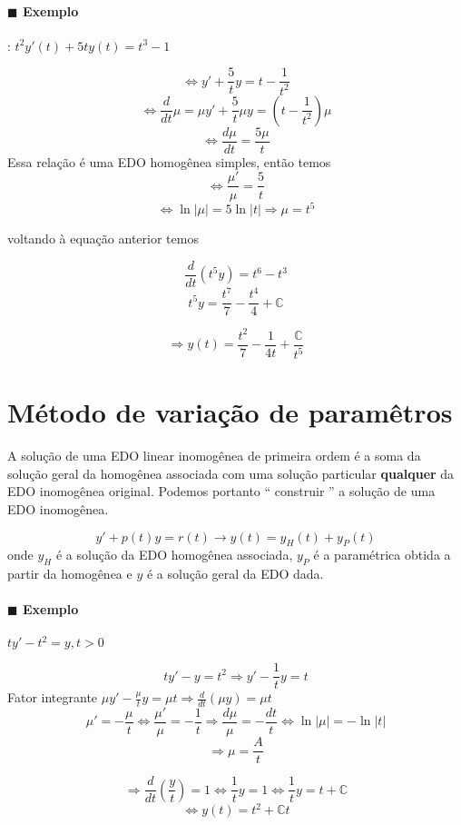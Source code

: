 \paragraph{$\blacksquare$ Exemplo}: \( t^2 y'(t) + 5ty(t) = t^3 - 1 \) 

\[ \Leftrightarrow y' + \frac{5}{t}y = t - \frac{1}{t^2}  \]
\[ \Leftrightarrow \frac{d}{dt}\mu = \mu y' + \frac{5}{t}\mu y = \left( t - \frac{1}{t^2}\right)\mu \]
\[ \Leftrightarrow  \frac{d\mu}{dt}= \frac{5\mu}{t} \]
Essa relação é uma EDO homogênea simples, então temos
\[ \Leftrightarrow \frac{\mu'}{\mu} = \frac{5}{t} \]
\[ \Leftrightarrow \ln|\mu| = 5 \ln |t| \Rightarrow \mu = t^5\]

voltando à equação anterior temos

\[ \frac{d}{dt} \left( t^5 y \right) = t^6 - t^3 \]
\[ t^5 y = \frac{t^7}{7} - \frac{t^4}{4} + \mathbb{C} \]

\[ \Rightarrow y(t) = \frac{t^2}{7}- \frac{1}{4t} + \frac{\mathbb{C}}{t^5} \]


\section{Método de variação de paramêtros}
A solução de uma EDO linear inomogênea de primeira ordem é a soma da solução geral da homogênea
associada com uma solução particular \textbf{qualquer} da EDO inomogênea original.
Podemos portanto `` construir '' a solução de uma EDO inomogênea.


\[ y' + p(t) y = r(t) \rightarrow y(t) = y_{H} (t) + y_{P} (t) \]
onde \( y_{H} \) é a solução da EDO homogênea associada, \( y_P \) é a paramétrica obtida a partir
da homogênea e \( y \) é a solução geral da EDO dada.

\paragraph{$\blacksquare$ Exemplo} \( t y' - t^2 = y, t >0 \) 

\[ t y' - y = t^2 \Rightarrow y' - \frac{1}{t}y = t  \]
Fator integrante \( \mu y' - \frac{\mu}{t}y = \mu t \Rightarrow \frac{d}{dt} \left( \mu y \right) = \mu t \) 
\[ \mu ' = - \frac{\mu }{t} \Leftrightarrow \frac{\mu'}{\mu} = - \frac{1}{t} \Rightarrow \frac{d\mu}{\mu}= - \frac{dt}{t} \Leftrightarrow \ln|\mu| = - \ln|t|\]
\[ \Rightarrow \mu = \frac{A}{t} \]

\[\Rightarrow \frac{d}{dt} \left( \frac{y}{t} \right)  = 1 \Leftrightarrow \frac{1}{t} y = 1 \Leftrightarrow \frac{1}{t}y = t +
  \mathbb{C} \]
\[ \Leftrightarrow y(t) = t^2 + \mathbb{C} t \]

